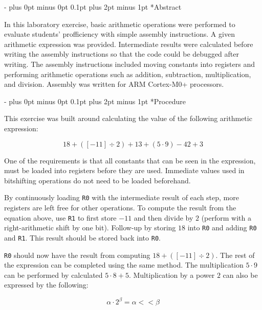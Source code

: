 \documentclass[\FontSize\FontUnit,letterpaper,oneside]{article}
\makeatletter
\def\code#1{\texttt{#1}}
\renewcommand \section{
    \@startsection{section}{1}{\z@}
      {\dimexpr \FontSize\FontUnit * 2 - \parskip \relax plus 0pt minus 0pt}
      {0.1pt plus 2pt minus 1pt} %
      {\normalfont\normalsize\bfseries}}
\makeatother
\begin{document}
\section*{Abstract}

\par In this laboratory exercise, basic arithmetic operations were performed
to evaluate students' profficiency with simple assembly instructions. A given
arithmetic expression was provided. Intermediate results were calculated 
before writing the assembly instructions so that the code could be debugged
after writing. The assembly instructions included moving constants into registers
and performing arithmetic operations such as addition, subtraction, multiplication,
and division. Assembly was written for ARM Cortex-M0+ processors.

\section*{Procedure}

This exercise was built around calculating the value of the following arithmetic
expression:

\begin{equation*}
18 + ([-11] \div 2) + 13 + (5 \cdot 9) - 42 + 3
\end{equation*}

One of the requirements is that all constants that can be seen in the expression, must
be loaded into registers before they are used. Immediate values used in bitshifting
operations do not need to be loaded beforehand.

By continuously loading \code{R0} with the intermediate result of each step, more registers
are left free for other operations. To compute the result from the equation above, use \code{R1}
to first store $-11$ and then divide by $2$ (perform with a right-arithmetic shift by one bit). 
Follow-up by storing $18$ into \code{R0} and adding \code{R0} and \code{R1}. This result should
be stored back into \code{R0}.

\code{R0} should now have the result from computing $18 + ([-11] \div 2)$. The rest of the expression
can be completed using the same method. The multiplication $5 \cdot 9$ can be performed by calculated
$5 \cdot 8 + 5$. Multiplication by a power $2$ can also be expressed by the following:

\begin{equation*}
\alpha \cdot 2^\beta = \alpha << \beta 
\end{equation*}
\end{document}
